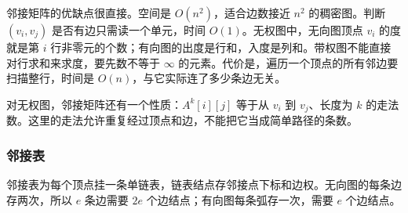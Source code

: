 邻接矩阵的优缺点很直接。空间是 $O(n^2)$，适合边数接近 $n^2$ 的稠密图。判断 $(v_i,v_j)$ 是否有边只需读一个单元，时间 $O(1)$。无权图中，无向图顶点 $v_i$ 的度就是第 $i$ 行非零元的个数；有向图的出度是行和，入度是列和。带权图不能直接对行求和来求度，要先数不等于 $\infty$ 的元素。代价是，遍历一个顶点的所有邻边要扫描整行，时间是 $O(n)$，与它实际连了多少条边无关。

对无权图，邻接矩阵还有一个性质：$A^k[i][j]$ 等于从 $v_i$ 到 $v_j$、长度为 $k$ 的走法数。这里的走法允许重复经过顶点和边，不能把它当成简单路径的条数。

\subsubsection{邻接表}

邻接表为每个顶点挂一条单链表，链表结点存邻接点下标和边权。无向图的每条边存两次，所以 $e$ 条边需要 $2e$ 个边结点；有向图每条弧存一次，需要 $e$ 个边结点。

